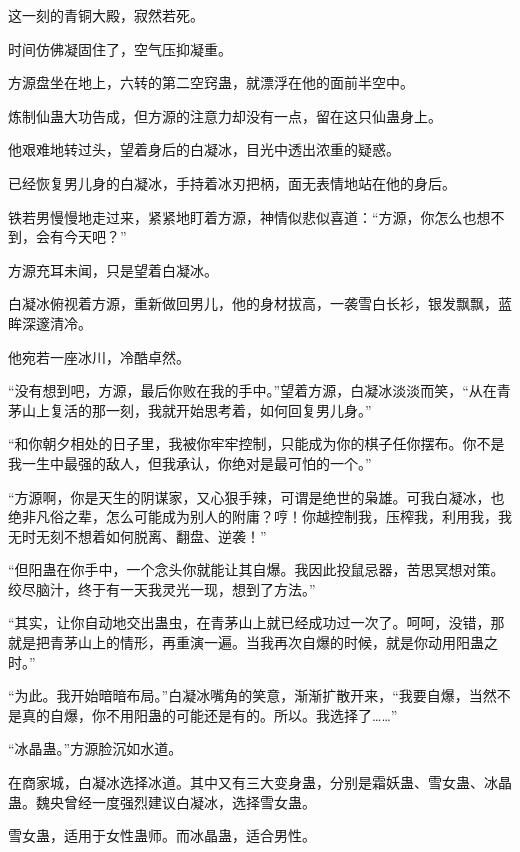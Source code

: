 
\begin{this_body}



这一刻的青铜大殿，寂然若死。

时间仿佛凝固住了，空气压抑凝重。

方源盘坐在地上，六转的第二空窍蛊，就漂浮在他的面前半空中。

炼制仙蛊大功告成，但方源的注意力却没有一点，留在这只仙蛊身上。

他艰难地转过头，望着身后的白凝冰，目光中透出浓重的疑惑。

已经恢复男儿身的白凝冰，手持着冰刃把柄，面无表情地站在他的身后。

铁若男慢慢地走过来，紧紧地盯着方源，神情似悲似喜道：“方源，你怎么也想不到，会有今天吧？”

方源充耳未闻，只是望着白凝冰。

白凝冰俯视着方源，重新做回男儿，他的身材拔高，一袭雪白长衫，银发飘飘，蓝眸深邃清冷。

他宛若一座冰川，冷酷卓然。

“没有想到吧，方源，最后你败在我的手中。”望着方源，白凝冰淡淡而笑，“从在青茅山上复活的那一刻，我就开始思考着，如何回复男儿身。”

“和你朝夕相处的日子里，我被你牢牢控制，只能成为你的棋子任你摆布。你不是我一生中最强的敌人，但我承认，你绝对是最可怕的一个。”

“方源啊，你是天生的阴谋家，又心狠手辣，可谓是绝世的枭雄。可我白凝冰，也绝非凡俗之辈，怎么可能成为别人的附庸？哼！你越控制我，压榨我，利用我，我无时无刻不想着如何脱离、翻盘、逆袭！”

“但阳蛊在你手中，一个念头你就能让其自爆。我因此投鼠忌器，苦思冥想对策。绞尽脑汁，终于有一天我灵光一现，想到了方法。”

“其实，让你自动地交出蛊虫，在青茅山上就已经成功过一次了。呵呵，没错，那就是把青茅山上的情形，再重演一遍。当我再次自爆的时候，就是你动用阳蛊之时。”

“为此。我开始暗暗布局。”白凝冰嘴角的笑意，渐渐扩散开来，“我要自爆，当然不是真的自爆，你不用阳蛊的可能还是有的。所以。我选择了……”

“冰晶蛊。”方源脸沉如水道。

在商家城，白凝冰选择冰道。其中又有三大变身蛊，分别是霜妖蛊、雪女蛊、冰晶蛊。魏央曾经一度强烈建议白凝冰，选择雪女蛊。

雪女蛊，适用于女性蛊师。而冰晶蛊，适合男性。


\end{this_body}
